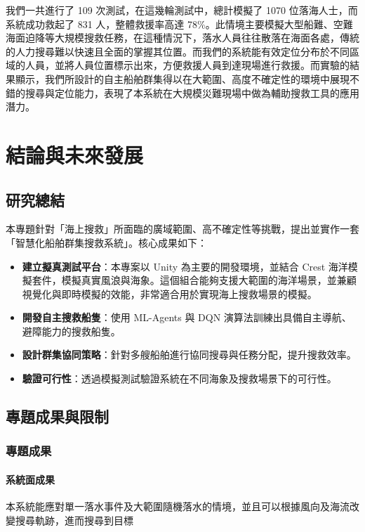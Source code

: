 \documentclass[12pt,a4paper]{article}
\begin{document}
我們一共進行了 109 次測試，在這幾輪測試中，總計模擬了 1070 位落海人士，而系統成功救起了 831 人，整體救援率高達 78\%。此情境主要模擬大型船難、空難海面迫降等大規模搜救任務，在這種情況下，落水人員往往散落在海面各處，傳統的人力搜尋難以快速且全面的掌握其位置。而我們的系統能有效定位分布於不同區域的人員，並將人員位置標示出來，方便救援人員到達現場進行救援。而實驗的結果顯示，我們所設計的自主船舶群集得以在大範圍、高度不確定性的環境中展現不錯的搜尋與定位能力，表現了本系統在大規模災難現場中做為輔助搜救工具的應用潛力。

\newpage

\section{結論與未來發展}

\subsection{研究總結}
本專題針對「海上搜救」所面臨的廣域範圍、高不確定性等挑戰，提出並實作一套「智慧化船舶群集搜救系統」。核心成果如下：
\begin{itemize}
	\item \textbf{建立擬真測試平台}：本專案以 Unity 為主要的開發環境，並結合 Crest 海洋模擬套件，模擬真實風浪與海象。這個組合能夠支援大範圍的海洋場景，並兼顧視覺化與即時模擬的效能，非常適合用於實現海上搜救場景的模擬。
	\item \textbf{開發自主搜救船隻}：使用 ML-Agents 與 DQN 演算法訓練出具備自主導航、避障能力的搜救船隻。
	\item \textbf{設計群集協同策略}：針對多艘船舶進行協同搜尋與任務分配，提升搜救效率。
	\item \textbf{驗證可行性}：透過模擬測試驗證系統在不同海象及搜救場景下的可行性。
\end{itemize}

\subsection{專題成果與限制}
\subsubsection{專題成果}
\paragraph{系統面成果} 本系統能應對單一落水事件及大範圍隨機落水的情境，並且可以根據風向及海流改變搜尋軌跡，進而搜尋到目標
\end{document}
